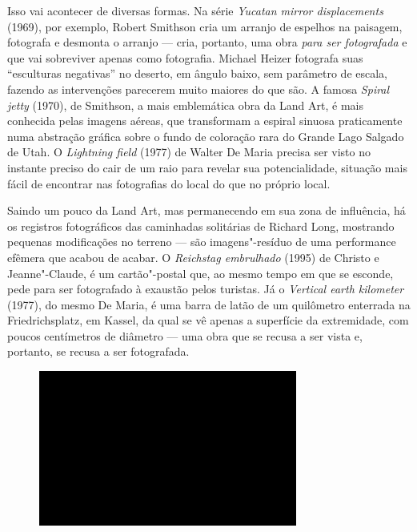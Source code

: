 Isso vai acontecer de diversas formas. Na série \emph{Yucatan mirror
displacements} (1969), por exemplo, Robert Smithson cria um arranjo de
espelhos na paisagem, fotografa e desmonta o arranjo --- cria, portanto,
uma obra \emph{para ser fotografada} e que vai sobreviver apenas como
fotografia. Michael Heizer fotografa suas ``esculturas negativas'' no
deserto, em ângulo baixo, sem parâmetro de escala, fazendo as
intervenções parecerem muito maiores do que são. A famosa \emph{Spiral
jetty} (1970), de Smithson, a mais emblemática obra da Land Art, é mais conhecida pelas imagens aéreas, que
transformam a espiral sinuosa praticamente numa abstração gráfica sobre
o fundo de coloração rara do Grande Lago Salgado de Utah. O
\emph{Lightning field} (1977) de Walter De Maria precisa ser visto no
instante preciso do cair de um raio para revelar sua potencialidade,
situação mais fácil de encontrar nas fotografias do local do que no
próprio local.

Saindo um pouco da Land Art, mas permanecendo em sua zona de influência,
há os registros fotográficos das caminhadas solitárias de Richard Long,
mostrando pequenas modificações no terreno --- são imagens"-resíduo de uma
performance efêmera que acabou de acabar. O \emph{Reichstag embrulhado}
(1995) de Christo e Jeanne"-Claude, é um cartão"-postal que, ao mesmo tempo em que se esconde, pede para ser
fotografado à exaustão pelos turistas. Já o \emph{Vertical earth
kilometer} (1977), do mesmo De Maria, é uma barra de latão de um
quilômetro enterrada na Friedrichsplatz, em Kassel, da qual se vê apenas
a superfície da extremidade, com poucos centímetros de diâmetro --- uma
obra que se recusa a ser vista e, portanto, se recusa a ser fotografada.

\begin{figure}[!ht]

\centering
 \includegraphics[width=85mm]{./imgs/im1.jpg}
\caption{\tiny{}}

\end{figure}

